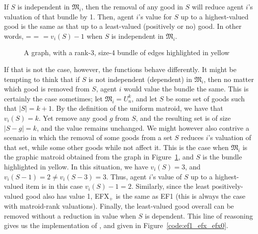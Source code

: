 If $S$ is independent in $\mathfrak{M}_i$, then the removal of any good in $S$ will reduce agent $i$'s valuation of that bundle by 1. Then, agent $i$'s value for $S$ up to a highest-valued good is the same as that up to a least-valued (positively or no) good. In other words,  =  =  $=v_i(S)-1$ when $S$ is independent in $\mathfrak{M}_i$. 

\begin{figure}[ht!]
  \centering
\caption{A graph, with a rank-3, size-4 bundle of edges highlighted in yellow}
\label{fig:redundant-bundle}
\end{figure}

If that is not the case, however, the functions behave differently. It might be tempting to think that if $S$ is not independent (dependent) in $\mathfrak{M}_i$, then no matter which good is removed from $S$, agent $i$ would value the bundle the same. This is certainly the case sometimes; let $\mathfrak{M}_i = U_n^k$, and let $S$ be some set of goods such that $|S| = k+1$. By the definition of the uniform matroid, we have that $v_i(S) = k$. Yet remove any good $g$ from $S$, and the resulting set is of size $|S-g| = k$, and the value remains unchanged. We might however also contrive a scenario in which the removal of some goods from a set $S$ reduces $i$'s valuation of that set, while some other goods while not affect it. This is the case when $\mathfrak{M}_i$ is the graphic matroid obtained from the graph in Figure~\ref{fig:redundant-bundle}, and $S$ is the bundle highlighted in yellow. In this situation, we have $v_i(S)=3$, and $v_i(S-1) = 2 \neq v_i(S-3) = 3$. Thus, agent $i$'s value of $S$ up to a highest-valued item is in this case $v_i(S)-1 = 2$. Similarly, since the least positively-valued good also has value 1, EFX$_+$ is the same as EF1 (this is always the case with matroid-rank valuations). Finally, the least-valued good overall can be removed without a reduction in value when $S$ is dependent. This line of reasoning gives us the implementation of ,  and  given in Figure~\ref{code:ef1_efx_efx0}.

